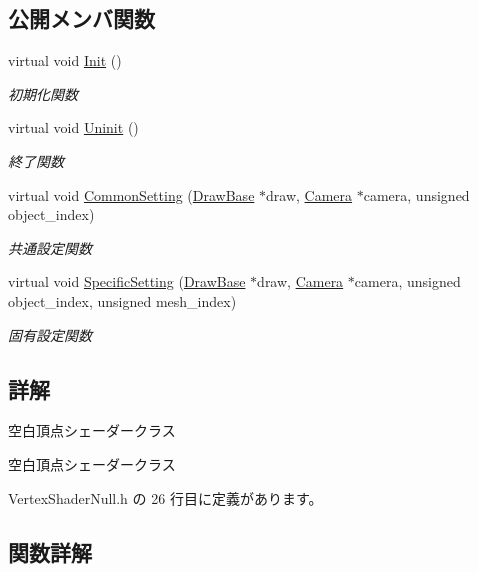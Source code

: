 \subsection*{公開メンバ関数}
\begin{DoxyCompactItemize}
\item 
virtual void \mbox{\hyperlink{class_vertex_shader_null_af30eb8057fe0537bc6ade214647b6fb5}{Init}} ()
\begin{DoxyCompactList}\small\item\em 初期化関数 \end{DoxyCompactList}\item 
virtual void \mbox{\hyperlink{class_vertex_shader_null_a16334df4ac02db3dd63f042622032301}{Uninit}} ()
\begin{DoxyCompactList}\small\item\em 終了関数 \end{DoxyCompactList}\item 
virtual void \mbox{\hyperlink{class_vertex_shader_null_a95f1a66045fb39c42cf0566f1990b6a1}{Common\+Setting}} (\mbox{\hyperlink{class_draw_base}{Draw\+Base}} $\ast$draw, \mbox{\hyperlink{class_camera}{Camera}} $\ast$camera, unsigned object\+\_\+index)
\begin{DoxyCompactList}\small\item\em 共通設定関数 \end{DoxyCompactList}\item 
virtual void \mbox{\hyperlink{class_vertex_shader_null_aa2234c6ea083e3c0233d59f222145992}{Specific\+Setting}} (\mbox{\hyperlink{class_draw_base}{Draw\+Base}} $\ast$draw, \mbox{\hyperlink{class_camera}{Camera}} $\ast$camera, unsigned object\+\_\+index, unsigned mesh\+\_\+index)
\begin{DoxyCompactList}\small\item\em 固有設定関数 \end{DoxyCompactList}\end{DoxyCompactItemize}


\subsection{詳解}
空白頂点シェーダークラス 

空白頂点シェーダークラス 

 Vertex\+Shader\+Null.\+h の 26 行目に定義があります。



\subsection{関数詳解}
\mbox{\label{class_vertex_shader_null_a95f1a66045fb39c42cf0566f1990b6a1}} 
